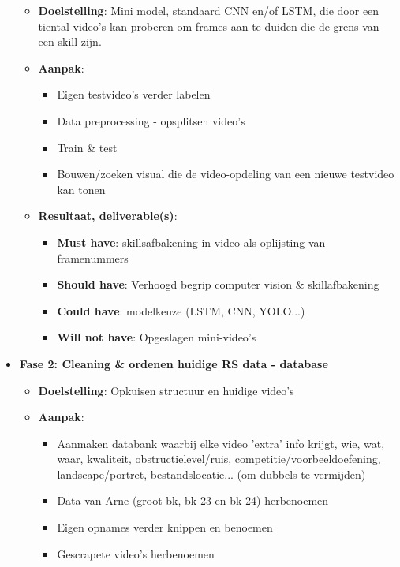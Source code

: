 \begin{itemize}
    \begin{itemize}
        \item \textbf{Doelstelling}: Mini model, standaard CNN en/of LSTM, die door een tiental video's kan proberen om frames aan te duiden die de grens van een skill zijn.
        \item \textbf{Aanpak}:
        \begin{itemize}
            \item Eigen testvideo's verder labelen
            \item Data preprocessing - opsplitsen video's
            \item Train \& test
            \item Bouwen/zoeken visual die de video-opdeling van een nieuwe testvideo kan tonen
        \end{itemize}
        \item \textbf{Resultaat, deliverable(s)}:
        \begin{itemize}
            \item \textbf{Must have}: skillsafbakening in video als oplijsting van framenummers
            \item \textbf{Should have}: Verhoogd begrip computer vision \& skillafbakening
            \item \textbf{Could have}: modelkeuze (LSTM, CNN, YOLO...)
            \item \textbf{Will not have}: Opgeslagen mini-video's
        \end{itemize}
    \end{itemize}
    \item \textbf{Fase 2: Cleaning \& ordenen huidige RS data - database}
    \begin{itemize}
        \item \textbf{Doelstelling}: Opkuisen structuur en huidige video's
        \item \textbf{Aanpak}:
        \begin{itemize}
            \item Aanmaken databank waarbij elke video 'extra' info krijgt, wie, wat, waar, kwaliteit, obstructielevel/ruis, competitie/voorbeeldoefening, landscape/portret, bestandslocatie... (om dubbels te vermijden)
            \item Data van Arne (groot bk, bk 23 en bk 24) herbenoemen
            \item Eigen opnames verder knippen en benoemen
            \item Gescrapete video's herbenoemen

\end{itemize}
\end{itemize}
\end{itemize}
